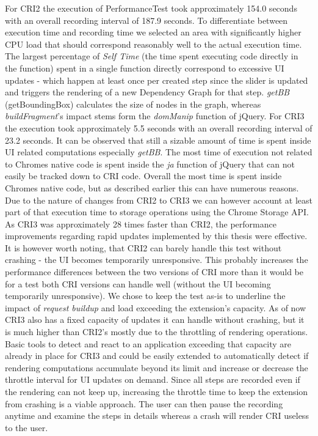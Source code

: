 	For CRI2 the execution of PerformanceTest took approximately 154.0 seconds with an overall recording interval of 187.9 seconds. To differentiate between execution time and recording time we selected an area with significantly higher CPU load that should correspond reasonably well to the actual execution time. The largest percentage of \emph{Self Time} (the time spent executing code directly in the function) spent in a single function directly correspond to excessive UI updates - which happen at least once per created step since the slider is updated and triggers the rendering of a new Dependency Graph for that step. \emph{getBB} (getBoundingBox) calculates the size of nodes in the graph, whereas  \emph{buildFragment}'s impact stems form the \emph{domManip} function of jQuery.
	For CRI3 the execution took approximately 5.5 seconds with an overall recording interval of 23.2 seconds. It can be observed that still a sizable amount of time is spent inside UI related computations especially \emph{getBB}. The most time of execution not related to Chromes native code is spent inside the \emph{ja} function of jQuery that can not easily be tracked down to CRI code. Overall the most time is spent inside Chromes native code, but as described earlier this can have numerous reasons. Due to the nature of changes from CRI2 to CRI3 we can however account at least part of that execution time to storage operations using the Chrome Storage API. 
	As CRI3 was approximately 28 times faster than CRI2, the performance improvements regarding rapid updates implemented by this thesis were effective. It is however worth noting, that CRI2 can barely handle this test without crashing - the UI becomes temporarily unresponsive. This probably increases the performance differences between the two versions of CRI more than it would be for a test both CRI versions can handle well (without the UI becoming temporarily unresponsive). We chose to keep the test as-is to underline the impact of \emph{request buildup} and load exceeding the extension's capacity. 
	As of now CRI3 also has a fixed capacity of updates it can handle without crashing, but it is much higher than CRI2's mostly due to the throttling of rendering operations. Basic tools to detect and react to an application exceeding that capacity are already in place for CRI3 and could be easily extended to automatically detect if rendering computations accumulate beyond its limit and increase or decrease the throttle interval for UI updates on demand. Since all steps are recorded even if the rendering can not keep up, increasing the throttle time to keep the extension from crashing is a viable approach. The user can then pause the recording anytime and examine the steps in details whereas a crash will render CRI useless to the user.
	
